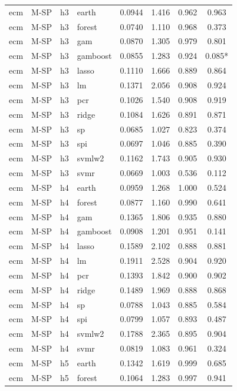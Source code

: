 \begin{ThreePartTable}
\begin{longtable}[t]{llclcccc}
\addlinespace
ecm & M-SP & h3 & earth & 0.0944 & 1.416 & 0.962 & 0.963\\
ecm & M-SP & h3 & forest & 0.0740 & 1.110 & 0.968 & 0.373\\
ecm & M-SP & h3 & gam & 0.0870 & 1.305 & 0.979 & 0.801\\
ecm & M-SP & h3 & gamboost & 0.0855 & 1.283 & 0.924 & 0.085*\\
ecm & M-SP & h3 & lasso & 0.1110 & 1.666 & 0.889 & 0.864\\
ecm & M-SP & h3 & lm & 0.1371 & 2.056 & 0.908 & 0.924\\
ecm & M-SP & h3 & pcr & 0.1026 & 1.540 & 0.908 & 0.919\\
ecm & M-SP & h3 & ridge & 0.1084 & 1.626 & 0.891 & 0.871\\
ecm & M-SP & h3 & sp & 0.0685 & 1.027 & 0.823 & 0.374\\
ecm & M-SP & h3 & spi & 0.0697 & 1.046 & 0.885 & 0.390\\
ecm & M-SP & h3 & svmlw2 & 0.1162 & 1.743 & 0.905 & 0.930\\
ecm & M-SP & h3 & svmr & 0.0669 & 1.003 & 0.536 & 0.112\\
\addlinespace
ecm & M-SP & h4 & earth & 0.0959 & 1.268 & 1.000 & 0.524\\
ecm & M-SP & h4 & forest & 0.0877 & 1.160 & 0.990 & 0.641\\
ecm & M-SP & h4 & gam & 0.1365 & 1.806 & 0.935 & 0.880\\
ecm & M-SP & h4 & gamboost & 0.0908 & 1.201 & 0.951 & 0.141\\
ecm & M-SP & h4 & lasso & 0.1589 & 2.102 & 0.888 & 0.881\\
ecm & M-SP & h4 & lm & 0.1911 & 2.528 & 0.904 & 0.920\\
ecm & M-SP & h4 & pcr & 0.1393 & 1.842 & 0.900 & 0.902\\
ecm & M-SP & h4 & ridge & 0.1489 & 1.969 & 0.888 & 0.868\\
ecm & M-SP & h4 & sp & 0.0788 & 1.043 & 0.885 & 0.584\\
ecm & M-SP & h4 & spi & 0.0799 & 1.057 & 0.893 & 0.487\\
ecm & M-SP & h4 & svmlw2 & 0.1788 & 2.365 & 0.895 & 0.904\\
ecm & M-SP & h4 & svmr & 0.0819 & 1.083 & 0.961 & 0.324\\
\addlinespace
ecm & M-SP & h5 & earth & 0.1342 & 1.619 & 0.999 & 0.685\\
ecm & M-SP & h5 & forest & 0.1064 & 1.283 & 0.997 & 0.941\\

\end{longtable}
\end{ThreePartTable}
